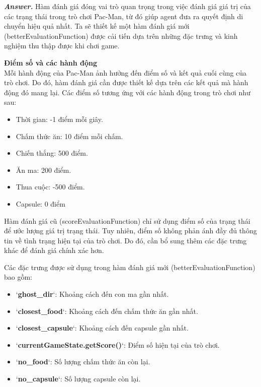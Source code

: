 \documentclass[12pt]{article}
\newenvironment{solution}[1][\it{Answer}]{\textbf{#1. } }{}
\begin{document}
\begin{solution}
Hàm đánh giá đóng vai trò quan trọng trong việc đánh giá giá trị của các trạng thái trong trò chơi Pac-Man, từ đó giúp agent đưa ra quyết định di chuyển hiệu quả nhất. Ta sẽ thiết kế một hàm đánh giá mới (betterEvaluationFunction) được cải tiến dựa trên những đặc trưng và kinh nghiệm thu thập được khi chơi game.

\hspace{-1em}\textbf{Điểm số và các hành động}
\\
Mỗi hành động của Pac-Man ảnh hưởng đến điểm số và kết quả cuối cùng của trò chơi. Do đó, hàm đánh giá cần được thiết kế dựa trên các kết quả mà hành động đó mang lại. Các điểm số tương ứng với các hành động trong trò chơi như sau:

\begin{itemize}
    \item Thời gian: -1 điểm mỗi giây.
    \item Chấm thức ăn: 10 điểm mỗi chấm.
    \item Chiến thắng: 500 điểm.
    \item Ăn ma: 200 điểm.
    \item Thua cuộc: -500 điểm.
    \item Capsule: 0 điểm
\end{itemize}


Hàm đánh giá cũ (scoreEvaluationFunction) chỉ sử dụng điểm số của trạng thái để ước lượng giá trị trạng thái. Tuy nhiên, điểm số không phản ánh đầy đủ thông tin về tình trạng hiện tại của trò chơi. Do đó, cần bổ sung thêm các đặc trưng khác để đánh giá chính xác hơn.

Các đặc trưng được sử dụng trong hàm đánh giá mới (betterEvaluationFunction) bao gồm:

\begin{itemize}
    \item `\textbf{ghost\_dir}`: Khoảng cách đến con ma gần nhất.
    \item `\textbf{closest\_food}`: Khoảng cách đến chấm thức ăn gần nhất.
    \item `\textbf{closest\_capsule}`: Khoảng cách đến capsule gần nhất.
    \item `\textbf{currentGameState.getScore()}`: Điểm số hiện tại của trò chơi.
    \item `\textbf{no\_food}`: Số lượng chấm thức ăn còn lại.
    \item `\textbf{no\_capsule}`: Số lượng capsule còn lại.
\end{itemize}


\end{solution}
\end{document}
